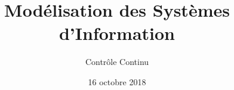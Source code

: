\title{
    Modélisation des Systèmes d'Information
}
\author{
	Contrôle Continu
}
\date{16 octobre 2018}
